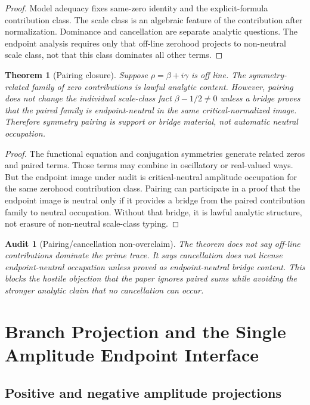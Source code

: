 \documentclass[11pt]{article}
\newtheorem{theorem}{Theorem}[section]
\newtheorem{audit}{Audit}[section]
\begin{document}
\begin{proof}
Model adequacy fixes same-zero identity and the explicit-formula contribution class.  The scale class is an algebraic feature of the contribution after normalization.  Dominance and cancellation are separate analytic questions.  The endpoint analysis requires only that off-line zerohood projects to non-neutral scale class, not that this class dominates all other terms.
\end{proof}

\begin{theorem}[Pairing closure]
Suppose \(\rho=\beta+i\gamma\) is off line.  The symmetry-related family of zero contributions is lawful analytic content.  However, pairing does not change the individual scale-class fact \(\beta-1/2\ne 0\) unless a bridge proves that the paired family is endpoint-neutral in the same critical-normalized image.  Therefore symmetry pairing is support or bridge material, not automatic neutral occupation.
\end{theorem}

\begin{proof}
The functional equation and conjugation symmetries generate related zeros and paired terms.  Those terms may combine in oscillatory or real-valued ways.  But the endpoint image under audit is critical-neutral amplitude occupation for the same zerohood contribution class.  Pairing can participate in a proof that the endpoint image is neutral only if it provides a bridge from the paired contribution family to neutral occupation.  Without that bridge, it is lawful analytic structure, not erasure of non-neutral scale-class typing.
\end{proof}

\begin{audit}[Pairing/cancellation non-overclaim]
The theorem does not say off-line contributions dominate the prime trace.  It says cancellation does not license endpoint-neutral occupation unless proved as endpoint-neutral bridge content.  This blocks the hostile objection that the paper ignores paired sums while avoiding the stronger analytic claim that no cancellation can occur.
\end{audit}

\section{Branch Projection and the Single Amplitude Endpoint Interface}

\subsection{Positive and negative amplitude projections}
\end{document}
